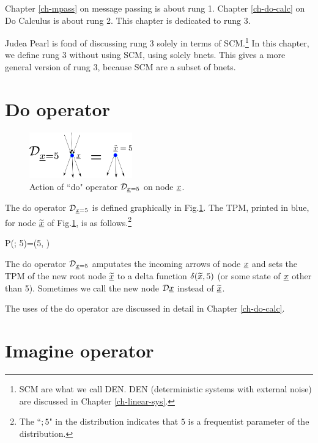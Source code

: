 Chapter \ref{ch-mpass}
on message passing
is about rung 1.
Chapter \ref{ch-do-calc}
on Do Calculus is about rung 2.
This chapter is dedicated to rung 3.

Judea Pearl
is fond of discussing rung 3 solely
in terms of SCM.\footnote{SCM are
what we call DEN. DEN (deterministic systems
with external noise) are discussed in
Chapter \ref{ch-linear-sys}. }
In this chapter,
we define rung 3
without using SCM, using solely
bnets.
This gives a more general
version of rung 3,
because SCM are a subset of bnets.


\section{Do operator}


\begin{figure}[h!]
\centering
\includegraphics[width=1.75in]
{counterf/rho-op.png}
\caption{Action
of ``do" operator ${\cal D}_{{\underline{x}}=5}$
on node ${\underline{x}}$.}
\label{fig-rho-op}
\end{figure}

The do operator ${\cal D}_{{\underline{x}}=5}$
is defined graphically in Fig.\ref{fig-rho-op}.
The TPM, printed in blue,
 for node ${\widetilde{{\underline{x}}}}$ of Fig.\ref{fig-rho-op},
is as follows.\footnote{The ``$;5$" 
in the distribution
indicates that $5$ 
is a frequentist parameter of the distribution.}

\beq\color{blue}
P(; 5)=\delta(5, )
\eeq


The do operator ${\cal D}_{{\underline{x}}=5}$
amputates
the incoming arrows of node ${\underline{x}}$
and sets the TPM
of the new root node ${\widetilde{{\underline{x}}}}$
to a delta function $\delta(
{\widetilde{x}}, 5)$
(or some state of ${\underline{x}}$
 other than 5).
Sometimes we call the new node
${\cal D}{\underline{x}}$
instead of
${\widetilde{{\underline{x}}}}$.

The uses of the do operator are discussed
in detail in Chapter \ref{ch-do-calc}.

\section{Imagine operator}

